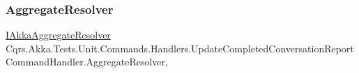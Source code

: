 \subsubsection{\texorpdfstring{Aggregate\+Resolver}{AggregateResolver}}
{\footnotesize\ttfamily \hyperlink{interfaceCqrs_1_1Akka_1_1Domain_1_1IAkkaAggregateResolver}{I\+Akka\+Aggregate\+Resolver} Cqrs.\+Akka.\+Tests.\+Unit.\+Commands.\+Handlers.\+Update\+Completed\+Conversation\+Report\+Command\+Handler.\+Aggregate\+Resolver\hspace{0.3cm}{\ttfamily [get]}, {\ttfamily [protected]}}

